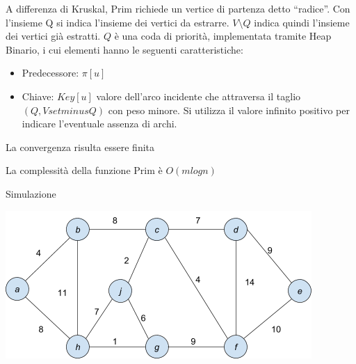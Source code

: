 {A differenza di Kruskal, Prim richiede un vertice di partenza detto ``radice''. Con l'insieme Q si indica l'insieme dei vertici da estrarre.
$V\setminus Q$ indica quindi l'insieme dei vertici già estratti. $Q$ è una coda di priorità, implementata tramite Heap Binario, i cui elementi hanno le seguenti caratteristiche:}

\begin{itemize}
\tightlist
\item
  Predecessore: $\pi[u]$
\item
Chiave: $Key[u]$ valore dell'arco incidente che attraversa il taglio $(Q,Vsetminus Q)$ con peso minore. Si utilizza il valore infinito positivo per indicare l'eventuale assenza di archi.
\end{itemize}



La convergenza risulta essere finita

La complessità della funzione Prim è $O(m logn)$

{Simulazione}

{\includegraphics{images/image542.png}}
